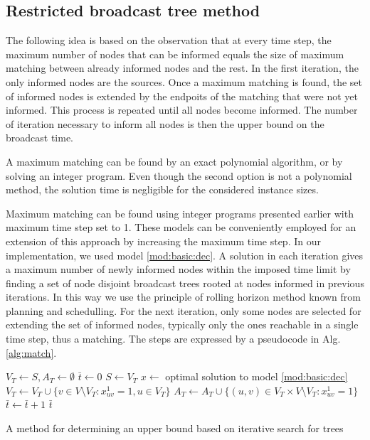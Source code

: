 \subsection{Restricted broadcast tree method}

The following idea is based on the observation that at every time step, the maximum number of nodes that can be informed equals the size of maximum matching between already informed nodes and the rest.
In the first iteration, the only informed nodes are the sources.
Once a maximum matching is found, the set of informed nodes is extended by the endpoits of the matching that were not yet informed.
This process is repeated until all nodes become informed.
The number of iteration necessary to inform all nodes is then the upper bound on the broadcast time.

A maximum matching can be found by an exact polynomial algorithm, or by solving an integer program.
Even though the second option is not a polynomial method, the solution time is negligible for the considered instance sizes.

Maximum matching can be found using integer programs presented earlier with maximum time step set to 1.
These models can be conveniently employed for an extension of this approach by increasing the maximum time step.
In our implementation, we used model \eqref{mod:basic:dec}.
A solution in each iteration gives a maximum number of newly informed nodes within the imposed time limit by finding a set of node disjoint broadcast trees rooted at nodes informed in previous iterations.
In this way we use the principle of rolling horizon method known from planning and schedulling.
For the next iteration, only some nodes are selected for extending the set of informed nodes, typically only the ones reachable in a single time step, thus a matching.
The steps are expressed by a pseudocode in Alg. \ref{alg:match}.
\begin{algorithm}[]
$V_T\leftarrow S, A_T \leftarrow \emptyset$\;
$\bar{t}\leftarrow 0$\;
 {
	$S\leftarrow V_T$\;
	$x\leftarrow$ optimal solution to model \eqref{mod:basic:dec}\;
	$V_T\leftarrow V_T\cup \{v\in V\setminus V_T:x_{uv}^1=1, u\in V_T\}$\;
	$A_T\leftarrow A_T\cup \{(u,v)\in V_T\times V\setminus V_T: x_{uv}^1=1\}$\;
	$\bar{t}\leftarrow \bar{t}+1$\;
}
\Return $\bar{t}$\;
 \caption{A method for determining an upper bound based on iterative search for  trees}
\label{alg:match}
\end{algorithm}

